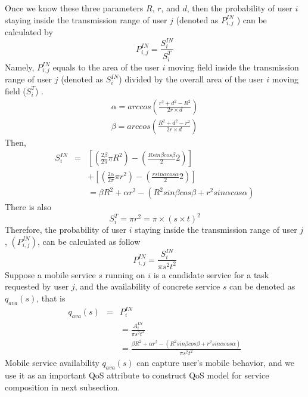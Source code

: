 \documentclass[10pt,journal,compsoc]{IEEEtran}
\begin{document}
​Once we know these three parameters $R$, $r$, and $d$, then the probability of user $i$ staying inside the transmission range of user $j$ (denoted as $P_{i,j}^{IN}$ ) can be calculated by
\begin{equation}
P_{i,j}^{IN} = \frac{S_i^{IN}}{S_i^T}
\end{equation}
Namely, $P^{IN}_{i,j}$ equals to the area of the user $i$ moving field inside the transmission range of user $j$ (denoted as $S^{IN}_i$) divided by the overall area of the user $i$ moving field ($S^T_i$) \cite{Yang2010}.
\begin{eqnarray}
\alpha = arccos(\frac{r^2+d^2-R^2}{2r\times d}) \\\nonumber
\beta = arccos(\frac{R^2+d^2-r^2}{2r\times d})
\end{eqnarray}
Then,
\setlength{\arraycolsep}{0.0em}
\begin{eqnarray}
S^{IN}_i&{}={} &[(\frac{2\beta}{2\pi}\pi R^2)-(\frac{R sin\beta cos\beta}{2}2)]\\\nonumber
&&+ [(\frac{2\alpha}{2\pi}\pi r^2)-(\frac{r sin\alpha cos\alpha}{2}2)]\\\nonumber
&&= \beta R^2 + \alpha r^2 - (R^2 sin\beta cos\beta + r^2 sin\alpha cos\alpha)
\end{eqnarray}
\setlength{\arraycolsep}{5pt}
There is also
\begin{equation}
S_i^T = \pi r^2 = \pi \times (s \times t)^2
\end{equation}
Therefore, the probability of user $i$ staying inside the transmission range of user $j$, $(P^{IN}_{i,j})$, can be calculated as follow
\begin{equation}
P_{i,j}^{IN} = \frac{S_i^{IN}}{\pi s^2 t^2}
\end{equation}
Suppose a mobile service $s$ running on $i$ is a candidate service for a task requested by user $j$, and the availability of concrete service $s$ can be denoted as $q_{ava}(s)$, that is
\setlength{\arraycolsep}{0.0em}
\begin{eqnarray}
q_{ava}(s) &{} = {}& P^{IN}_i \\\nonumber
&& = \frac{A_i^{IN}}{\pi s^2 t^2}\\\nonumber
&& = \frac{\beta R^2 + \alpha r^2 - (R^2 sin\beta cos\beta + r^2 sin\alpha cos\alpha)}{\pi s^2 t^2}
\end{eqnarray}
\setlength{\arraycolsep}{5pt}
Mobile service availability $q_{ava}(s)$ can capture user's mobile behavior, and we use it as an important QoS attribute to construct QoS model for service composition in next subsection.
\end{document}
